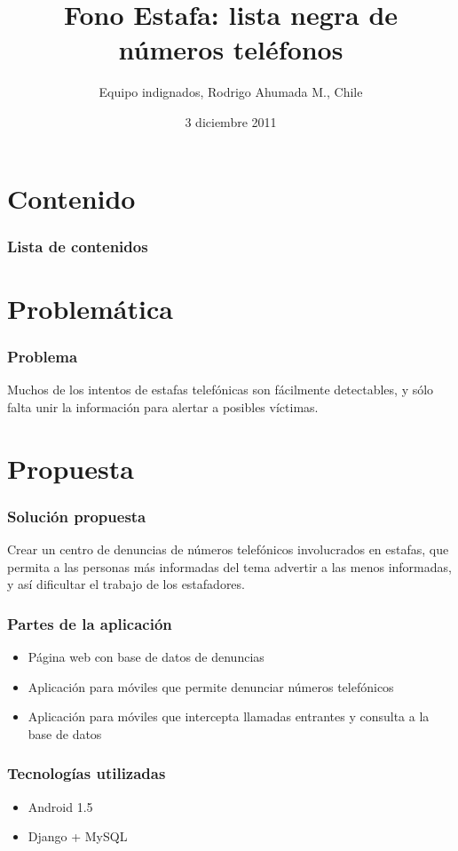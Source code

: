 \documentclass{beamer}
\title[Fono Estafa]{Fono Estafa: lista negra de números teléfonos}
\author[Rodrigo Ahumada M.]{Equipo indignados, Rodrigo Ahumada M., Chile}
\date[]{3 diciembre 2011}
\begin{document}
\frame{\titlepage}

\section*{Contenido}
\frame
{
	\frametitle{Lista de contenidos}
	\tableofcontents
}


\section{Problemática}
\frame
{
	\frametitle{Problema}
	
	Muchos de los intentos de estafas telefónicas son fácilmente detectables, y sólo
	falta unir la información para alertar a posibles víctimas.
}


\section{Propuesta}
\frame
{
	\frametitle{Solución propuesta}

	Crear un centro de denuncias de números telefónicos involucrados en estafas,
	que permita a las personas más informadas del tema advertir a las menos informadas,
	y así dificultar el trabajo de los estafadores.
}


\frame
{
	\frametitle{Partes de la aplicación}

	\begin{itemize}
	\pause
	\item Página web con base de datos de denuncias
	\pause
	\item Aplicación para móviles que permite denunciar números telefónicos
	\pause
	\item Aplicación para móviles que intercepta llamadas entrantes y consulta a la base de datos
	\end{itemize}
}



\frame
{
	\frametitle{Tecnologías utilizadas}
	\begin{itemize}
	\item Android 1.5
	\item Django + MySQL
	\end{itemize}
}
\end{document}
